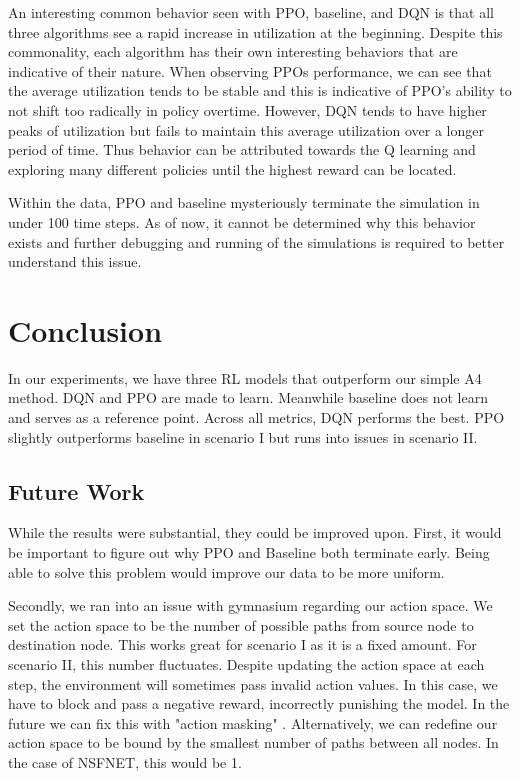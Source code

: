 \documentclass[conference]{IEEEtran}
\begin{document}
An interesting common behavior seen with PPO, baseline, and DQN is that all three algorithms see a rapid increase in utilization at the beginning. Despite this commonality, each algorithm has their own interesting behaviors that are indicative of their nature. When observing PPOs performance, we can see that the average utilization tends to be stable and this is indicative of PPO's ability to not shift too radically in policy overtime. However, DQN tends to have higher peaks of utilization but fails to maintain this average utilization over a longer period of time. Thus behavior can be attributed towards the Q learning and exploring many different policies until the highest reward can be located. 

Within the data, PPO and baseline mysteriously terminate the simulation in under 100 time steps. As of now, it cannot be determined why this behavior exists and further debugging and running of the simulations is required to better understand this issue.


\section{Conclusion}

In our experiments, we have three RL models that outperform our simple A4 method. DQN and PPO are made to learn. Meanwhile baseline does not learn and serves as a reference point. Across all metrics, DQN performs the best. PPO slightly outperforms baseline in scenario I but runs into issues in scenario II.

\subsection{Future Work}

While the results were substantial, they could be improved upon. First, it would be important to figure out why PPO and Baseline both terminate early. Being able to solve this problem would improve our data to be more uniform. 

Secondly, we ran into an issue with gymnasium regarding our action space. We set the action space to be the number of possible paths from source node to destination node. This works great for scenario I as it is a fixed amount. For scenario II, this number fluctuates. Despite updating the action space at each step, the environment will sometimes pass invalid action values. In this case, we have to block and pass a negative reward, incorrectly punishing the model. In the future we can fix this with "action masking" \cite{action_mask_tutorial}\cite{action_mask_stack_overflow}. Alternatively, we can redefine our action space to be bound by the smallest number of paths between all nodes. In the case of NSFNET, this would be 1.
\end{document}

